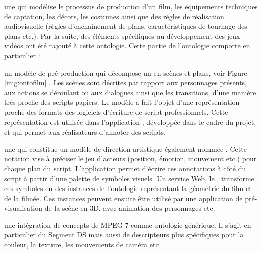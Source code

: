 \begin{listeni}
	\item une  qui modélise le processus de production d'un film, les équipements techniques de captation, les décors, les costumes ainsi que des règles de réalisation audiovisuelle (règles d'enchaînement de plans, caractéristiques de tournage des plans etc.).
	Par la suite, des éléments spécifiques au développement des jeux vidéos ont été rajouté à cette ontologie.
	Cette partie de l'ontologie comporte en particulier : 

	\begin{liste}
		\item un modèle de pré-production qui décompose un  en scènes et plans, voir Figure \ref{img:ontofilm} .
		Les scènes sont décrites par rapport aux personnages présents, aux actions se déroulant ou aux dialogues ainsi que les transitions, d'une manière très proche des scripts papiers.
		Le modèle a fait l'objet d'une représentation proche des formats des logiciels d'écriture de script professionnels.  
		Cette représentation est utilisée dans l'application , développée dans le cadre du projet, et qui permet aux réalisateurs d'annoter des scripts.\\
	\end{liste}

	\item une  qui constitue un modèle de direction artistique également nommée  . 
	Cette notation vise à préciser le jeu d'acteurs (position, émotion, mouvement etc.) pour chaque plan du script. 
	L'application  permet d'écrire ces annotations à côté du script à partir d'une palette de symboles visuels. 
	Un service Web, le , transforme ces symboles en des instances de l'ontologie représentant la géométrie du film et de la  filmée.
	Ces instances peuvent ensuite être utilisé par une application de pré-visualisation de la scène en 3D, avec animation des personnages etc.

	\item une intégration de concepts de MPEG-7 comme ontologie générique. 
	Il s'agit en particulier du Segment DS mais aussi de descripteurs plus spécifiques pour la couleur, la texture, les mouvements de caméra etc.
\end{listeni}

